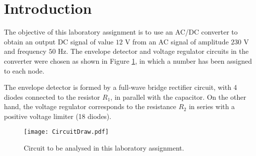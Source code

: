\section{Introduction}

The objective of this laboratory assignment is to use an AC/DC converter to obtain an output DC signal of value $12$ V from an AC signal of amplitude $230$ V and frequency $50$ Hz. The envelope detector and voltage regulator circuits in the converter were chosen as shown in Figure \ref{fig:CircuitDraw}, in which a number has been assigned to each node.
\par
The envelope detector is formed by a full-wave bridge rectifier circuit, with 4 diodes connected to the resistor $R_1$, in parallel with the capacitor. On the other hand, the voltage regulator corresponds to the resistance $R_2$ in series with a positive voltage limiter (18 diodes).

\begin{figure}[H] \centering
  \texttt{[image: CircuitDraw.pdf]}
  \caption{Circuit to be analysed in this laboratory assignment.}
  \label{fig:CircuitDraw}
\end{figure}
